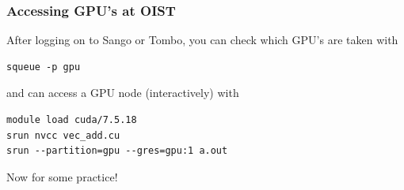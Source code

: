\documentclass{beamer}
\begin{document}
\begin{frame}[fragile]
\frametitle{Accessing GPU's at OIST}

After logging on to Sango or Tombo, you can check which GPU's are taken with 

\begin{lstlisting}
squeue -p gpu
\end{lstlisting}

and can access a GPU node (interactively) with

\begin{lstlisting}
module load cuda/7.5.18
srun nvcc vec_add.cu
srun --partition=gpu --gres=gpu:1 a.out
\end{lstlisting}


\pause
\vspace{-0.5cm}
\begin{center}
\Huge{Now for some practice!}
\end{center}
\end{frame}
\end{document}
